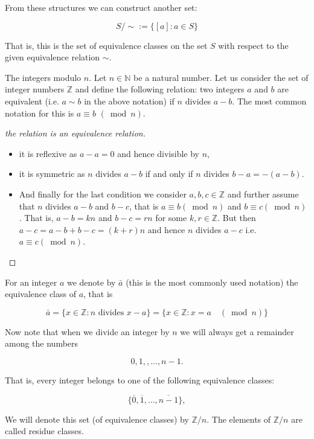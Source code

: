 \noindent From these structures we can construct another set:

$$
S / \sim:=\{[a]: a \in S\}
$$

\noindent That is, this is the set of equivalence classes on the set $S$ with respect to the given equivalence relation $\sim$.

\begin{definition}
  
The integers modulo $n$. Let $n \in \mathbb{N}$ be a natural number. Let us consider the set of integer numbers $\mathbb{Z}$ and define the following relation: two integers $a$ and $b$ are equivalent (i.e. $a \sim b$ in the above notation) if $n$ divides $a-b$. The most common notation for this is $a \equiv b$ $(\bmod n)$.

\end{definition}

\begin{proof}[the relation is an equivalence relation] \emph{}
  
\begin{itemize}\item[-] it is reflexive as $a-a=0$ and hence divisible by $n$,
\item[-] it is symmetric as $n$ divides $a-b$ if and only if $n$ divides $b-a=-(a-b)$.
\item[-] And finally for the last condition we consider $a, b, c \in \mathbb{Z}$ and further assume that $n$ divides $a-b$ and $b-c$, that is $a \equiv b(\bmod n)$ and $b \equiv c(\bmod n)$. That is, $a-b=k n$ and $b-c=r n$ for some $k, r \in \mathbb{Z}$. But then $a-c=a-b+b-c=(k+r) n$ and hence $n$ divides $a-c$ i.e. $a \equiv c(\bmod n)$.
\end{itemize}
\end{proof}

\begin{definition}
  For an integer $a$ we denote by $\bar{a}$ (this is the most commonly used notation) the equivalence class of $a$, that is

$$
\bar{a}=\{x \in \mathbb{Z}: n \text { divides } x-a\}=\{x \in \mathbb{Z}: x=a \quad(\bmod n)\}
$$


Now note that when we divide an integer by $n$ we will always get a remainder among the numbers

$$
0,1,, \ldots, n-1 .
$$

That is, every integer belongs to one of the following equivalence classes:

$$
\{\overline{0}, \overline{1}, \ldots, \overline{n-1}\},
$$

We will denote this set (of equivalence classes) by $\mathbb{Z} / n$. The elements of $\mathbb{Z} / n$ are called residue classes.
\end{definition}

